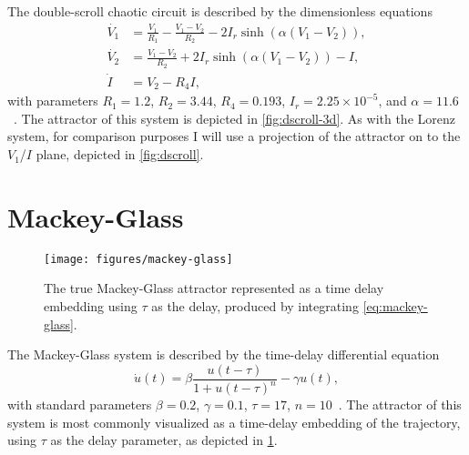 The double-scroll chaotic circuit is described by the dimensionless equations
\begin{equation}
 \begin{aligned}
   \dot{V_1} &= \frac{V_1}{R_1} - \frac{V_1 - V_2}{R_2} - 2 I_r \sinh\left(\alpha(V_1 - V_2)\right), \\
   \dot{V_2} &= \frac{V_1 - V_2}{R_2} + 2 I_r \sinh\left(\alpha(V_1 - V_2)\right) - I, \\
   \dot{I} &= V_2 - R_4 I,
 \end{aligned}
 \label{eq:dscroll}
\end{equation}
with parameters $R_1 = 1.2$, $R_2 = 3.44$, $R_4 = 0.193$, $I_r = 2.25
\times 10^{-5}$, and $\alpha = 11.6$~\cite{gauthier1996}. The
attractor of this system is depicted in \cref{fig:dscroll-3d}. As
with the Lorenz system, for comparison purposes I will use a
projection of the attractor on to the $V_1$/$I$ plane, depicted in
\cref{fig:dscroll}.

\section{Mackey-Glass}\label{sec:mackey-glass}

\begin{figure}
  \texttt{[image: figures/mackey-glass]}
  \caption{The true Mackey-Glass attractor represented as a time delay embedding using $\tau$ as the delay, produced by integrating \cref{eq:mackey-glass}.}%
  \label{fig:mackey-glass}
\end{figure}

The Mackey-Glass system is described by the time-delay differential equation
\begin{equation}
  \dot{u}(t) = \beta \frac{u(t - \tau)}{1 + u(t - \tau)^n} - \gamma u(t),
  \label{eq:mackey-glass}
\end{equation}
with standard parameters $\beta = 0.2$, $\gamma = 0.1$, $\tau = 17$,
$n = 10$~\cite{mackey1977}. The attractor of this system is most
commonly visualized as a time-delay embedding of the trajectory, using
$\tau$ as the delay parameter, as depicted in \cref{fig:mackey-glass}.
